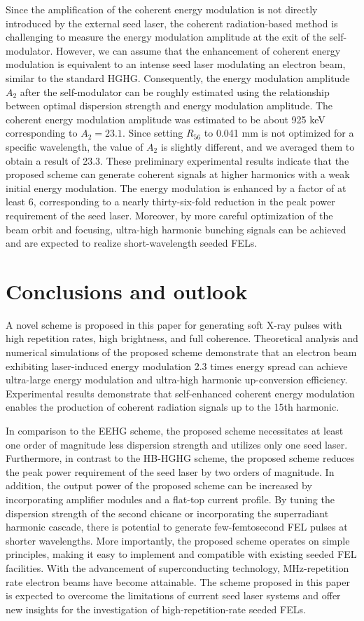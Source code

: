 \documentclass[%
 reprint,
 amsmath,amssymb,
 aps,
]{revtex4-2}
\begin{document}
Since the amplification of the coherent energy modulation is not directly introduced by the external seed laser, the coherent radiation-based method \citep{Feng2011} is challenging to measure the energy modulation amplitude at the exit of the self-modulator. However, we can assume that the enhancement of coherent energy modulation is equivalent to an intense seed laser modulating an electron beam, similar to the standard HGHG. Consequently, the energy modulation amplitude $A_2$ after the self-modulator can be roughly estimated using the relationship between optimal dispersion strength and energy modulation amplitude. The coherent energy modulation amplitude was estimated to be about 925 keV corresponding to $A_2=23.1$. Since setting $R_{56}$ to 0.041 mm is not optimized for a specific wavelength, the value of $A_2$ is slightly different, and we averaged them to obtain a result of 23.3. These preliminary experimental results indicate that the proposed scheme can generate coherent signals at higher harmonics with a weak initial energy modulation. The energy modulation is enhanced by a factor of at least 6, corresponding to a nearly thirty-six-fold reduction in the peak power requirement of the seed laser. Moreover, by more careful optimization of the beam orbit and focusing, ultra-high harmonic bunching signals can be achieved and are expected to realize short-wavelength seeded FELs.


\section{\label{sec:6}Conclusions and outlook}
A novel scheme is proposed in this paper for generating soft X-ray pulses with high repetition rates, high brightness, and full coherence. Theoretical analysis and numerical simulations of the proposed scheme demonstrate that an electron beam exhibiting laser-induced energy modulation 2.3 times energy spread can achieve ultra-large energy modulation and ultra-high harmonic up-conversion efficiency. Experimental results 
demonstrate that self-enhanced coherent energy modulation enables the production of coherent radiation signals up to the 15th harmonic.

In comparison to the EEHG scheme, the proposed scheme necessitates at least one order of magnitude less dispersion strength and utilizes only one seed laser. Furthermore, in contrast to the HB-HGHG scheme, the proposed scheme reduces the peak power requirement of the seed laser by two orders of magnitude. In addition, the output power of the proposed scheme can be increased by incorporating amplifier modules and a flat-top current profile. By tuning the dispersion strength of the second chicane or incorporating the superradiant harmonic cascade, there is potential to generate few-femtosecond FEL pulses at shorter wavelengths. More importantly, the proposed scheme operates on simple principles, making it easy to implement and compatible with existing seeded FEL facilities. With the advancement of superconducting technology, MHz-repetition rate electron beams have become attainable. The scheme proposed in this paper is expected to overcome the limitations of current seed laser systems and offer new insights for the investigation of high-repetition-rate seeded FELs.
\end{document}
